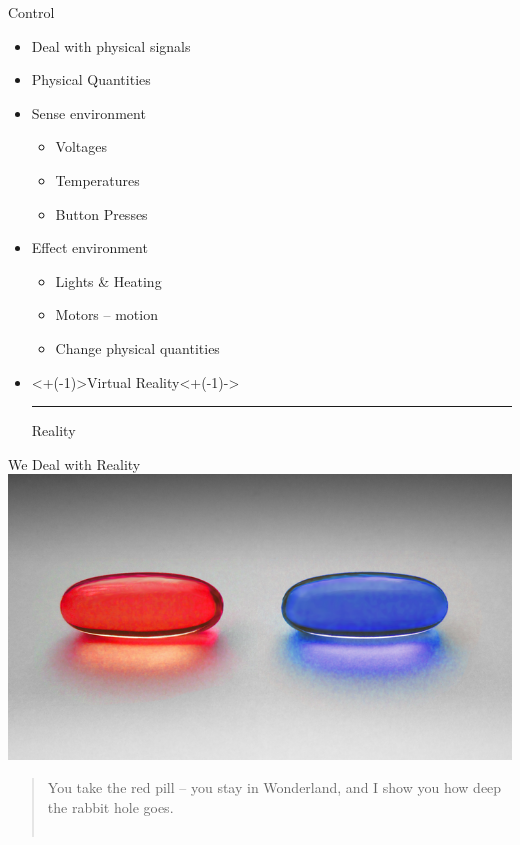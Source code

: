 \documentclass[xcolor=svgnames]{beamer}
\begin{document}
\newcommand\redout{\bgroup\markoverwith
{\textcolor{red}{\rule[0.3ex]{2pt}{2pt}}}\ULon}
\begin{frame}{Control}
    \begin{itemize}[<+->]
        \item Deal with physical signals
        \item Physical Quantities
        \item Sense environment
        \begin{itemize}
          \item Voltages
          \item Temperatures
          \item Button Presses
        \end{itemize}
        \item Effect environment
        \begin{itemize}
            \item Lights \& Heating
            \item Motors -- motion
            \item Change physical quantities
        \end{itemize}
        \item \only<+(-1)>{Virtual Reality}\only<+(-1)->{\redout{Virtual} Reality}
    \end{itemize}
\end{frame}

\begin{frame}{We Deal with Reality}
    \includegraphics{Red_and_blue_pill.png}\\
    \pause
    \begin{quote}
        You take the red pill -- you stay in Wonderland, and I show you how deep the rabbit hole goes.\\
        ~\hspace*{\fill}{\textit Morpheus, The Matrix}
    \end{quote}
\end{frame}
\end{document}
